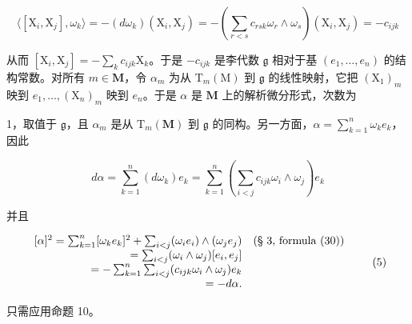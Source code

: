 \[
\langle [ \mathrm{X} _ {i}, \mathrm{X} _ {j} ], \omega_ {k} \rangle = - (d \omega_ {k}) (\mathrm{X} _ {i}, \mathrm{X} _ {j}) = - \left(\sum_ {r <   s} c _ {r s k} \omega_ {r} \wedge \omega_ {s}\right) (\mathrm{X} _ {i}, \mathrm{X} _ {j}) = - c _ {i j k}
\]

从而 \([\mathrm{X}_i,\mathrm{X}_j] = -\sum_{k}c_{ijk}\mathrm{X}_k\)。于是 \(-c_{ijk}\) 是李代数 \(\mathfrak{g}\) 相对于基 \((e_1,\dots ,e_n)\) 的结构常数。对所有 \(m\in \mathbf{M}\)，令 \(\alpha_{m}\) 为从 \(\mathrm{T}_{m}(\mathrm{M})\) 到 \(\mathfrak{g}\) 的线性映射，它把 \((\mathrm{X}_1)_m\) 映到 \(e_1,\ldots ,(\mathrm{X}_n)_m\) 映到 \(e_n\)。于是 \(\alpha\) 是 \(\mathbf{M}\) 上的解析微分形式，次数为

1，取值于 \(\mathfrak{g}\)，且 \(\alpha_{m}\) 是从 \(\mathrm{T}_m(\mathbf{M})\) 到 \(\mathfrak{g}\) 的同构。另一方面，\(\alpha = \sum_{k=1}^{n} \omega_k e_k\)，因此

\[
d \alpha = \sum_ {k = 1} ^ {n} (d \omega_ {k}) e _ {k} = \sum_ {k = 1} ^ {n} \left(\sum_ {i <   j} c _ {i j k} \omega_ {i} \wedge \omega_ {j}\right) e _ {k}
\]

并且

\[
\begin{array}{r l} {[ \alpha ] ^ {2} = \sum_ {k = 1} ^ {n} [ \omega_ {k} e _ {k} ] ^ {2} + \sum_ {i <   j} (\omega_ {i} e _ {i}) \wedge (\omega_ {j} e _ {j})} & {\text {(§ 3, formula (30))}} \\ {= \sum_ {i <   j} (\omega_ {i} \wedge \omega _ {j}) [ e _ {i}, e _ {j} ]} \\ {= - \sum_ {k = 1} ^ {n} \sum_ {i <   j} (c _ {i j k} \omega_ {i} \wedge \omega_ {j}) e _ {k}} \\ {= - d \alpha.} \end{array}\tag{5}
\]

只需应用命题 10。

